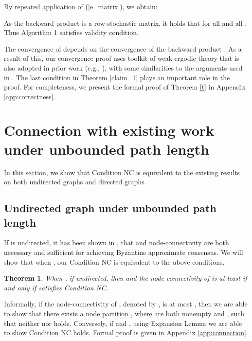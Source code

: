 \documentclass[letterpaper, 11pt]{article}
\newtheorem{theorem}{Theorem}[section]
\begin{document}
By repeated application of (\ref{e_matrix}), we obtain:

As the backward product  is a row-stochastic matrix, it holds that  for all  and all . Thus Algorithm 1 satisfies validity condition.

The convergence of  depends on the convergence of the backward product . As a result of this, our convergence proof uses toolkit of weak-ergodic theory that is also adopted in prior work
(e.g., \cite{Jadbabaie2003,Benezit,vaidyaII,leblanc_HiCoNs}),
with some similarities to the arguments used in \cite{vaidyaII,leblanc_HiCoNs}. The last condition in Theorem \ref{claim_1} plays an important role in the proof. For completeness, we present the formal proof of Theorem \ref{t} in Appendix \ref{app:correctness}.











\section{Connection with existing work under unbounded path length}
In this section, we show that Condition NC is equivalent to the existing results on both undirected graphs and directed graphs.  

\subsection{Undirected graph under unbounded path length}
\label{sec: extension}
If  is undirected, it has been shown in \cite{impossible_proof_lynch}, that  and node-connectivity  are both necessary and sufficient for achieving Byzantine approximate consensus. We will show that when , our Condition NC is equivalent to the above conditions.

\begin{theorem}
\label{equiUndirected}
  When , if  undirected, then  and the   node-connectivity of  is at least  if and only if  satisfies Condition NC.
\end{theorem}
Informally, if the node-connectivity of , denoted by , is at most , then we are able to show that there exists a node partition , where  are both nonempty and , such that neither  nor  holds. Conversely, if  and , using Expansion Lemma we are able to show Condition NC holds. Formal proof is given in Appendix \ref{app:connection}. 
\end{document}
